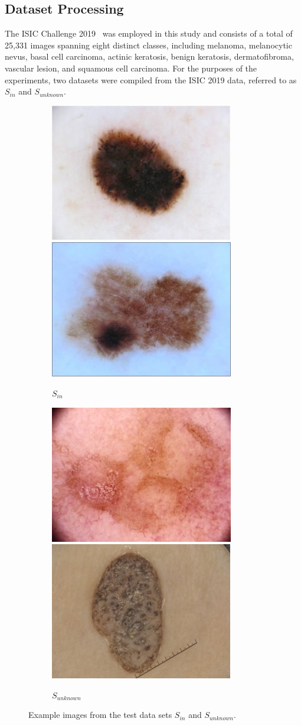 \subsection{Dataset Processing}
\label{subsec:selective_binary_dataset}
The ISIC Challenge 2019~\citep{codella2018skin,combalia2019bcn20000,tschandl2018ham10000} was employed in this study and consists of a total of 25,331 images spanning eight distinct classes, including melanoma, melanocytic nevus, basal cell carcinoma, actinic keratosis, benign keratosis, dermatofibroma, vascular lesion, and squamous cell carcinoma. For the purposes of the experiments, two datasets were compiled from the ISIC 2019 data, referred to as $S_{in}$ and $S_{unknown}$.

\begin{figure}[h]
	\centering
	\begin{subfigure}{\textwidth}
		\centering
		\includegraphics[width=0.3\linewidth]{images/MEL.jpg}
		\includegraphics[width=0.3\linewidth]{images/NV.jpg}
		\caption{\(S_{in}\)}
	\end{subfigure}
	\begin{subfigure}{\textwidth}
		\centering
		\includegraphics[width=0.3\linewidth]{images/SCC.jpg}
		\includegraphics[width=0.3\linewidth]{images/BLK.jpg}
		\caption{\(S_{unknown}\)}
	\end{subfigure}
	\caption{Example images from the test data sets \(S_{in}\) and \(S_{unknown}\).}
	\label{fig:isic_dataset_examples}
\end{figure}

